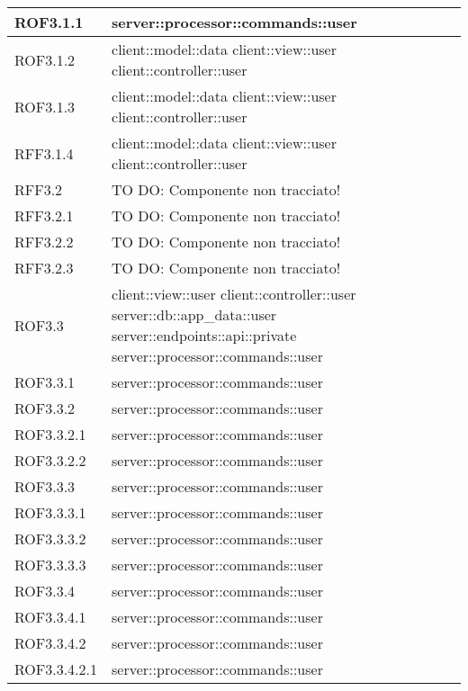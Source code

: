 \begin{center}
\begin{longtable}{| p{4cm} | p{8cm} |}
\hline
ROF3.1.1 & server::processor::commands::user \\
\hline
ROF3.1.2 & client::model::data \newline client::view::user \newline client::controller::user \\
\hline
ROF3.1.3 & client::model::data \newline client::view::user \newline client::controller::user \\
\hline
RFF3.1.4 & client::model::data \newline client::view::user \newline client::controller::user \\
\hline
RFF3.2 & TO DO: Componente non tracciato! \\
\hline
RFF3.2.1 & TO DO: Componente non tracciato! \\
\hline
RFF3.2.2 & TO DO: Componente non tracciato! \\
\hline
RFF3.2.3 & TO DO: Componente non tracciato! \\
\hline
ROF3.3 & client::view::user \newline client::controller::user \newline server::db::app\_data::user \newline server::endpoints::api::private \newline server::processor::commands::user \\
\hline
ROF3.3.1 & server::processor::commands::user \\
\hline
ROF3.3.2 & server::processor::commands::user \\
\hline
ROF3.3.2.1 & server::processor::commands::user \\
\hline
ROF3.3.2.2 & server::processor::commands::user \\
\hline
ROF3.3.3 & server::processor::commands::user \\
\hline
ROF3.3.3.1 & server::processor::commands::user \\
\hline
ROF3.3.3.2 & server::processor::commands::user \\
\hline
ROF3.3.3.3 & server::processor::commands::user \\
\hline
ROF3.3.4 & server::processor::commands::user \\
\hline
ROF3.3.4.1 & server::processor::commands::user \\
\hline
ROF3.3.4.2 & server::processor::commands::user \\
\hline
ROF3.3.4.2.1 & server::processor::commands::user \\

\end{longtable}
\end{center}
